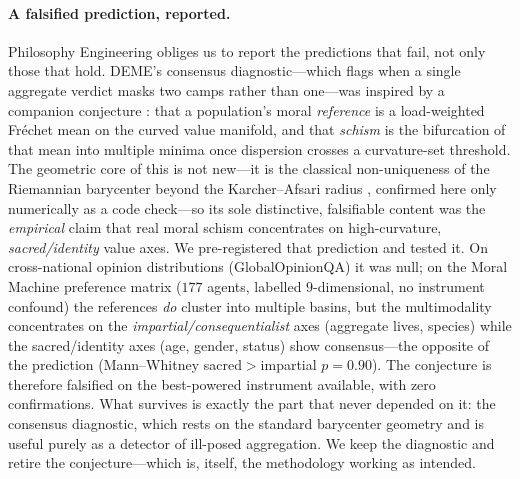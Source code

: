 \paragraph{A falsified prediction, reported.} Philosophy Engineering obliges us to report the
predictions that fail, not only those that hold. DEME's consensus diagnostic---which flags when a
single aggregate verdict masks two camps rather than one---was inspired by a companion conjecture
\cite{bond_ert}: that a population's moral \emph{reference} is a load-weighted Fr\'echet mean on the
curved value manifold, and that \emph{schism} is the bifurcation of that mean into multiple minima
once dispersion crosses a curvature-set threshold. The geometric core of this is not new---it is the
classical non-uniqueness of the Riemannian barycenter beyond the Karcher--Afsari radius
\cite{karcher1977,afsari2011}, confirmed here only numerically as a code check---so its sole
distinctive, falsifiable content was the \emph{empirical} claim that real moral schism concentrates
on high-curvature, \emph{sacred/identity} value axes. We pre-registered that prediction and tested it.
On cross-national opinion distributions (GlobalOpinionQA) it was null; on the Moral Machine preference
matrix  ($177$ agents, labelled $9$-dimensional, no instrument confound) the references \emph{do}
cluster into multiple basins, but the multimodality concentrates on the \emph{impartial/consequentialist}
axes (aggregate lives, species) while the sacred/identity axes (age, gender, status) show
consensus---the opposite of the prediction (Mann--Whitney sacred${>}$impartial $p{=}0.90$). The
conjecture is therefore falsified on the best-powered instrument available, with zero confirmations.
What survives is exactly the part that never depended on it: the consensus diagnostic, which rests on
the standard barycenter geometry and is useful purely as a detector of ill-posed aggregation. We keep
the diagnostic and retire the conjecture---which is, itself, the methodology working as intended.

